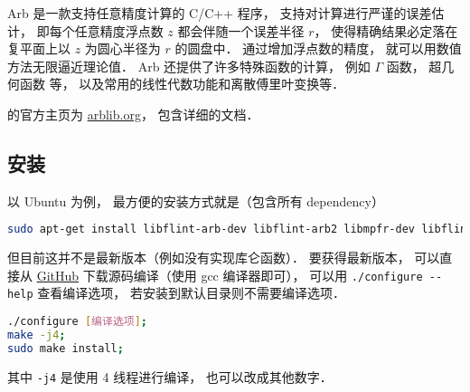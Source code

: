 
\pentry{}

Arb 是一款支持任意精度计算的 C/C++ 程序， 支持对计算进行严谨的误差估计， 即每个任意精度浮点数 $z$ 都会伴随一个误差半径 $r$， 使得精确结果必定落在复平面上以 $z$ 为圆心半径为 $r$ 的圆盘中． 通过增加浮点数的精度， 就可以用数值方法无限逼近理论值． Arb 还提供了许多特殊函数的计算， 例如 $\Gamma$ 函数， 超几何函数 等， 以及常用的线性代数功能和离散傅里叶变换等．

的官方主页为 \href{https://arblib.org/}{arblib.org}， 包含详细的文档．

\subsection{安装}
以 Ubuntu 为例， 最方便的安装方式就是（包含所有 dependency）
\begin{lstlisting}[language=bash]
sudo apt-get install libflint-arb-dev libflint-arb2 libmpfr-dev libflint-dev
\end{lstlisting}
但目前这并不是最新版本（例如没有实现库仑函数）． 要获得最新版本， 可以直接从 \href{https://github.com/fredrik-johansson/arb/}{GitHub} 下载源码编译（使用 gcc 编译器即可）， 可以用 \verb|./configure --help| 查看编译选项， 若安装到默认目录则不需要编译选项．
\begin{lstlisting}[language=bash]
./configure [编译选项];
make -j4;
sudo make install;
\end{lstlisting}
其中 \verb|-j4| 是使用 4 线程进行编译， 也可以改成其他数字．
